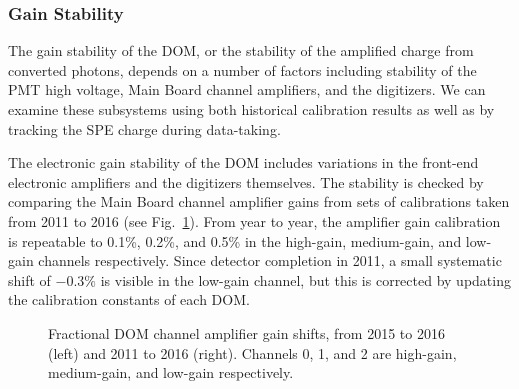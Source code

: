 \subsubsection{Gain Stability}

The gain stability of the DOM, or the stability of the amplified charge
from converted photons, depends on a number of factors including stability
of the PMT high voltage, Main Board channel amplifiers, and the digitizers.
We can examine these subsystems using both historical calibration results
as well as by tracking the SPE charge during data-taking.

The electronic gain stability of the DOM includes variations in the
front-end electronic amplifiers and the digitizers themselves.  The
stability is checked by comparing the Main Board channel amplifier gains
from sets of calibrations taken from 2011 to 2016 (see
Fig.~\ref{fig:domcal_ch_gain}).  From year to year, the amplifier gain
calibration is repeatable to 0.1\%, 0.2\%, and 0.5\% in the high-gain,
medium-gain, and low-gain channels respectively.  Since detector completion
in 2011, a small systematic shift of $-0.3\%$ is visible in the low-gain
channel, but this is corrected by updating the calibration constants of
each DOM.

\begin{figure}[!h]
  \captionsetup[subfigure]{labelformat=empty}
  \centering
  \caption{Fractional DOM channel amplifier gain shifts, from 2015 to
    2016 (left) and 2011 to 2016 (right).  Channels 0, 1, and 2 are
    high-gain, medium-gain, and low-gain respectively.}
  \label{fig:domcal_ch_gain}
\end{figure}

